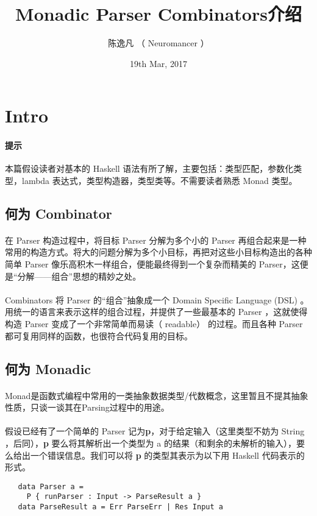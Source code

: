 \documentclass{article}
\title{Monadic Parser Combinators介绍}
\author{陈逸凡 （ Neuromancer ）}
\date{19th Mar, 2017}
\begin{document}
\maketitle

\section{Intro}
  \paragraph{提示}
   本篇假设读者对基本的 Haskell 语法有所了解，主要包括：类型匹配，参数化类型，lambda 表达式，类型构造器，类型类等。不需要读者熟悉 Monad 类型。  
 \subsection{何为 Combinator}
  \paragraph{}
   在 Parser 构造过程中，将目标 Parser 分解为多个小的 Parser 再组合起来是一种常用的构造方式。将大的问题分解为多个小目标，再把对这些小目标构造出的各种简单 Parser 像乐高积木一样组合，便能最终得到一个复杂而精美的 Parser，这便是“分解——组合”思想的精妙之处。
  \paragraph{}
   Combinators 将 Parser 的“组合”抽象成一个 Domain Specific Language (DSL) 。用统一的语言来表示这样的组合过程，并提供了一些最基本的 Parser ，这就使得构造 Parser 变成了一个非常简单而易读（ readable） 的过程。而且各种 Parser 都可复用同样的函数，也很符合代码复用的目标。
 \subsection{何为 Monadic}
  \paragraph{}
   Monad是函数式编程中常用的一类抽象数据类型/代数概念，这里暂且不提其抽象性质，只谈一谈其在Parsing过程中的用途。
  \paragraph{}
   假设已经有了一个简单的 Parser 记为\textbf{p}，对于给定输入（这里类型不妨为 String ，后同），\textbf{p} 要么将其解析出一个类型为 a 的结果（和剩余的未解析的输入），要么给出一个错误信息。我们可以将 \textbf{p} 的类型其表示为以下用 Haskell 代码表示的形式。
   \begin{lstlisting}
   data Parser a = 
     P { runParser : Input -> ParseResult a }
   data ParseResult a = Err ParseErr | Res Input a 
   \end{lstlisting}
\end{document}
